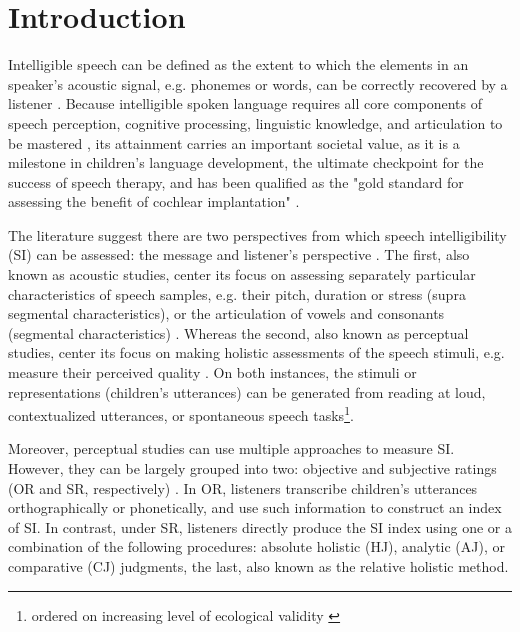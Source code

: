 \section{Introduction}

Intelligible speech can be defined as the extent to which the elements in an speaker's acoustic signal, e.g. phonemes or words, can be correctly recovered by a listener \citep{Kent_et_al_1989, Whitehill_et_al_2004, vanHeuven_2008, Freeman_et_al_2017}. Because intelligible spoken language requires all core components of speech perception, cognitive processing, linguistic knowledge, and articulation to be mastered \citep{Freeman_et_al_2017}, its attainment carries an important societal value, as it is a milestone in children's language development, the ultimate checkpoint for the success of speech therapy, and has been qualified as the "gold standard for assessing the benefit of cochlear implantation" \citep{Chin_et_al_2012}. 

The literature suggest there are two perspectives from which speech intelligibility (SI) can be assessed: the message and listener's perspective \citep{Boonen_et_al_2020, Boonen_et_al_2021}. The first, also known as acoustic studies, center its focus on assessing separately particular characteristics of speech samples, e.g. their pitch, duration or stress (supra segmental characteristics), or the articulation of vowels and consonants (segmental characteristics) \citep{Rowe_et_al_2018}. Whereas the second, also known as perceptual studies, center its focus on making holistic assessments of the speech stimuli, e.g. measure their perceived quality \citep{Boonen_et_al_2020, Boonen_et_al_2021}. On both instances, the stimuli or representations (children's utterances) can be generated from reading at loud, contextualized utterances, or spontaneous speech tasks\footnote{ordered on increasing level of ecological validity \citep{Flipsen_2006,Ertmer_2011}}.

\begin{comment}
Based on their description, it seems that that perceptual studies are more subjective than acoustic studies, as they do not rely on "objective" measurements, i.e. time duration, wave amplitude, among others, available in the former. However, for the case of SI, there are objective and subjective assessment methodologies.
\end{comment}

Moreover, perceptual studies can use multiple approaches to measure SI. However, they can be largely grouped into two: objective and subjective ratings (OR and SR, respectively) \citep{Hustad_et_al_2020}. In OR, listeners transcribe children's utterances orthographically or phonetically, and use such information to construct an index of SI. In contrast, under SR, listeners directly produce the SI index using one or a combination of the following procedures: absolute holistic (HJ), analytic (AJ), or comparative (CJ) judgments, the last, also known as the relative holistic method. 

